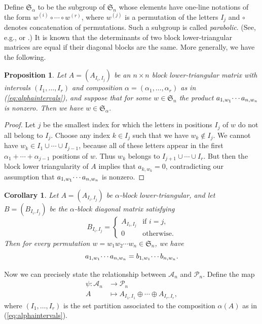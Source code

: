 \documentclass[12pt]{amsart}
\newtheorem{prop}[thm]{Proposition}
\newtheorem{cor}[thm]{Corollary}
\theoremstyle{definition}
\numberwithin{equation}{section}
\newcommand{\sn}{\mathfrak{S}_n}
\newcommand{\mfs}[1]{\mathfrak{S}_{#1}}
\newcommand{\ntnsp}{\negthinspace}
\newcommand{\permmon}[2]{#1_{1,#2_1} \ntnsp\cdots #1_{n,#2_n}}
\begin{document}
 Define $\mfs \alpha$ to be the subgroup of $\sn$ whose elements
 have
 one-line notations of the form $w^{(i)} \circ \cdots \circ w^{(r)}$,
 where $w^{(j)}$ is a permutation of the letters $I_j$ and $\circ$ denotes
 concatenation of permutations.  Such a subgroup is called {\em parabolic}.
 (See, e.g., \cite{BBCoxeter} or \cite{Hum}.)
 It is known that the determinants of two block lower-triangular matrices
 are equal if their diagonal blocks are the same.
 More generally, we have the following.
\begin{prop}\label{p:blocklt}
  Let $A = (A_{I_i,I_j})$ be an $n \times n$ block lower-triangular matrix with
  intervals $(I_1,\dotsc,I_r)$ and composition $\alpha = (\alpha_1,\dotsc,\alpha_r)$ as in (\ref{eq:alphaintervals}),
  and suppose that for some $w \in \sn$ the product $\permmon aw$
  is nonzero.  Then we have $w \in \mfs \alpha$.
\end{prop}
\begin{proof}
  Let $j$ be the smallest index for which the letters in positions $I_j$
  of $w$ do not all belong to $I_j$.
  Choose any index $k \in I_j$ such that
  we have $w_k \not\in I_j$.
  We cannot have $w_k \in I_1 \cup \cdots \cup I_{j-1}$,
  because all of these letters appear in the first
  $\alpha_1 + \cdots + \alpha_{j-1}$ positions of $w$.  Thus $w_k$ belongs
  to $I_{j+1} \cup \cdots \cup I_r$.
  But then the block lower triangularity of $A$ implies that $a_{k,w_k} = 0$,
  contradicting our assumption that $\permmon aw$ is nonzero.
  \end{proof}

\begin{cor}\label{c:AB}
  Let $A = (A_{I_i,I_j})$ be $\alpha$-block lower-triangular,
  and let  $B = (B_{I_i,I_j})$ be the $\alpha$-block diagonal matrix satisfying
  \begin{equation}\label{eq:diagonal}
    B_{I_i,I_j} = \begin{cases}
      A_{I_i,I_j} &\text{if $i = j$},\\
      0 &\text{otherwise}.
    \end{cases}
  \end{equation}
  Then for every permutation $w=w_1w_2\cdots w_n \in \sn$, we have
  \begin{equation}\label{eq:awbw}
    \permmon aw = \permmon bw.
  \end{equation}
\end{cor}

Now we can precisely state the relationship between $\mathcal A_n$
and $\mathcal P_n$.
Define the map
\begin{equation}\label{eq:psi}
  \begin{aligned}
    \psi: \mathcal A_n &\rightarrow \mathcal P_n\\
    A &\mapsto A_{I_1,I_1} \oplus \cdots \oplus A_{I_r,I_r},
  \end{aligned}
\end{equation}
where $(I_1,\dotsc,I_r)$ is the set partition associated
to the composition $\alpha(A)$ as in (\ref{eq:alphaintervals}).
\end{document}
